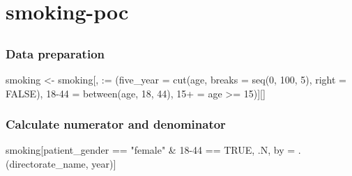 \documentclass[
  letterpaper,
  DIV=11,
  numbers=noendperiod]{scrreprt}
\newenvironment{Shaded}{\begin{snugshade}}{\end{snugshade}}
\newcommand{\AttributeTok}[1]{\textcolor[rgb]{0.40,0.45,0.13}{#1}}
\newcommand{\ConstantTok}[1]{\textcolor[rgb]{0.56,0.35,0.01}{#1}}
\newcommand{\DecValTok}[1]{\textcolor[rgb]{0.68,0.00,0.00}{#1}}
\newcommand{\FunctionTok}[1]{\textcolor[rgb]{0.28,0.35,0.67}{#1}}
\newcommand{\NormalTok}[1]{\textcolor[rgb]{0.00,0.23,0.31}{#1}}
\newcommand{\OtherTok}[1]{\textcolor[rgb]{0.00,0.23,0.31}{#1}}
\newcommand{\SpecialCharTok}[1]{\textcolor[rgb]{0.37,0.37,0.37}{#1}}
\newcommand{\StringTok}[1]{\textcolor[rgb]{0.13,0.47,0.30}{#1}}
\begin{document}

\chapter{smoking-poc}\label{smoking-poc}

\section{}\label{section}

\subsection{Data preparation}\label{data-preparation-1}

\begin{Shaded}
\begin{Highlighting}[]
\NormalTok{smoking }\OtherTok{\textless{}{-}}\NormalTok{ smoking[, }\StringTok{\textasciigrave{}}\AttributeTok{:=}\StringTok{\textasciigrave{}}\NormalTok{ (}\AttributeTok{five\_year =} \FunctionTok{cut}\NormalTok{(age, }\AttributeTok{breaks =} \FunctionTok{seq}\NormalTok{(}\DecValTok{0}\NormalTok{, }\DecValTok{100}\NormalTok{, }\DecValTok{5}\NormalTok{), }\AttributeTok{right =} \ConstantTok{FALSE}\NormalTok{), }\StringTok{\textasciigrave{}}\AttributeTok{18{-}44}\StringTok{\textasciigrave{}} \OtherTok{=} \FunctionTok{between}\NormalTok{(age, }\DecValTok{18}\NormalTok{, }\DecValTok{44}\NormalTok{), }\StringTok{\textasciigrave{}}\AttributeTok{15+}\StringTok{\textasciigrave{}} \OtherTok{=}\NormalTok{ age }\SpecialCharTok{\textgreater{}=} \DecValTok{15}\NormalTok{)][]}
\end{Highlighting}
\end{Shaded}

\subsection{Calculate numerator and
denominator}\label{calculate-numerator-and-denominator}

\begin{Shaded}
\begin{Highlighting}[]
\NormalTok{smoking[patient\_gender }\SpecialCharTok{==} \StringTok{"female"} \SpecialCharTok{\&} \StringTok{\textasciigrave{}}\AttributeTok{18{-}44}\StringTok{\textasciigrave{}} \SpecialCharTok{==} \ConstantTok{TRUE}\NormalTok{, .N, by }\OtherTok{=}\NormalTok{ .(directorate\_name, year)]}
\end{Highlighting}
\end{Shaded}
\end{document}

